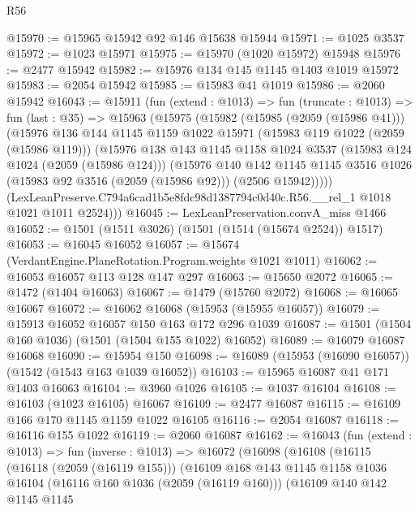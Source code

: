 \begin{lexlean}{R56}
\begin{coremodule}
@15970 := @15965 @15942 @92 @146 @15638 @15944
@15971 := @1025 @3537
@15972 := @1023 @15971
@15975 := @15970 (@1020 @15972) @15948
@15976 := @2477 @15942
@15982 := @15976 @134 @145 @1145 @1403 @1019 @15972
@15983 := @2054 @15942
@15985 := @15983 @41 @1019
@15986 := @2060 @15942
@16043 := @15911
    (fun (extend : @1013) =>
    fun (truncate : @1013) =>
    fun (last : @35) =>
    @15963
      (@15975
        (@15982
          (@15985 (@2059 (@15986 @41)))
          (@15976
            @136
            @144
            @1145
            @1159
            @1022
            @15971
            (@15983 @119 @1022 (@2059 (@15986 @119)))
            (@15976
              @138
              @143
              @1145
              @1158
              @1024
              @3537
              (@15983 @124 @1024 (@2059 (@15986 @124)))
              (@15976
                @140
                @142
                @1145
                @1145
                @3516
                @1026
                (@15983 @92 @3516 (@2059 (@15986 @92)))
                (@2506 @15942)))))
        (LexLeanPreserve.C794a6cad1b5e8fdc98d1387794c0d40c.R56.__rel_1 @1018 @1021 @1011 @2524)))
@16045 := LexLeanPreservation.convA_miss @1466
@16052 := @1501 (@1511 @3026) (@1501 (@1514 (@15674 @2524)) @1517)
@16053 := @16045 @16052
@16057 := @15674 (VerdantEngine.PlaneRotation.Program.weights @1021 @1011)
@16062 := @16053 @16057 @113 @128 @147 @297
@16063 := @15650 @2072
@16065 := @1472 (@1404 @16063)
@16067 := @1479 (@15760 @2072)
@16068 := @16065 @16067
@16072 := @16062 @16068 (@15953 (@15955 @16057))
@16079 := @15913 @16052 @16057 @150 @163 @172 @296 @1039
@16087 := @1501 (@1504 @160 @1036) (@1501 (@1504 @155 @1022) @16052)
@16089 := @16079 @16087 @16068
@16090 := @15954 @150
@16098 := @16089 (@15953 (@16090 @16057)) (@1542 (@1543 @163 @1039 @16052))
@16103 := @15965 @16087 @41 @171 @1403 @16063
@16104 := @3960 @1026
@16105 := @1037 @16104
@16108 := @16103 (@1023 @16105) @16067
@16109 := @2477 @16087
@16115 := @16109 @166 @170 @1145 @1159 @1022 @16105
@16116 := @2054 @16087
@16118 := @16116 @155 @1022
@16119 := @2060 @16087
@16162 := @16043
    (fun (extend : @1013) =>
    fun (inverse : @1013) =>
    @16072
      (@16098
        (@16108
          (@16115
            (@16118 (@2059 (@16119 @155)))
            (@16109
              @168
              @143
              @1145
              @1158
              @1036
              @16104
              (@16116 @160 @1036 (@2059 (@16119 @160)))
              (@16109
                @140
                @142
                @1145
                @1145

\end{coremodule}
\end{lexlean}
